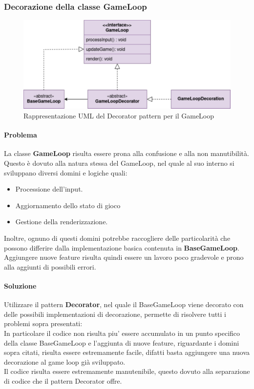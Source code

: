 \documentclass[a4paper,12pt]{report}
\begin{document}
\subsubsection*{Decorazione della classe GameLoop}
%
\begin{figure}[H]
	\centering{}
	\includegraphics[scale=0.75]{img/GameLoopDecorator.pdf}
	\caption{Rappresentazione UML del Decorator pattern per il GameLoop}
	\label{img:strategy}
	\end{figure}
%	
\paragraph*{Problema} La classe \textbf{GameLoop} risulta essere prona alla confusione e alla non manutibilità.
Questo è dovuto alla natura stessa del GameLoop, nel quale al suo interno si sviluppano diversi domini e logiche quali:
\begin{itemize}
	\item Processione dell'input.
	\item Aggiornamento dello stato di gioco
	\item Gestione della renderizzazione.
\end{itemize}
Inoltre, ognuno di questi domini potrebbe raccogliere delle particolarità che possono differire dalla implementazione basica contenuta in \textbf{BaseGameLoop}.
Aggiungere nuove feature risulta quindi essere un lavoro poco gradevole e prono alla aggiunti di possibili errori.
%
\paragraph*{Soluzione} Utilizzare il pattern \textbf{Decorator}, nel quale il BaseGameLoop viene decorato con delle possibili implementazioni di decorazione, permette di risolvere tutti i problemi sopra presentati:
\\
In particolare il codice non risulta piu' essere accumulato in un punto specifico della classe BaseGameLoop e 
l'aggiunta di nuove feature, riguardante i domini sopra citati, risulta essere estremamente facile, difatti basta aggiungere una nuova decorazione al game loop già sviluppato.
\\
Il codice risulta essere estremamente manutenibile, questo dovuto alla separazione di codice che il pattern Decorator offre.
%
\end{document}

